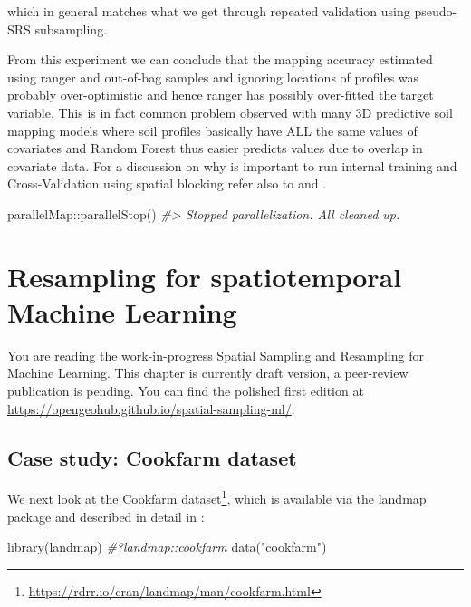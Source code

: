 \documentclass[
  graybox,natbib,nospthms]{svmono}
\newenvironment{Shaded}{\begin{snugshade}}{\end{snugshade}}
\newcommand{\CommentTok}[1]{\textcolor[rgb]{0.37,0.37,0.37}{\textit{#1}}}
\newcommand{\FunctionTok}[1]{\textcolor[rgb]{0,0,0}{#1}}
\newcommand{\NormalTok}[1]{#1}
\newcommand{\SpecialCharTok}[1]{\textcolor[rgb]{0,0,0}{#1}}
\newcommand{\StringTok}[1]{\textcolor[rgb]{0.5,0.5,0.5}{#1}}
\renewcommand{\href}[2]{#2 (\url{#1})}
\renewcommand{\href}[2]{#2\footnote{\url{#1}}}
\begin{document}
which in general matches what we get through repeated validation using pseudo-SRS
subsampling.

From this experiment we can conclude that the mapping accuracy estimated using
ranger and out-of-bag samples and ignoring locations of profiles was
probably over-optimistic and hence ranger has possibly over-fitted the target variable.
This is in fact common problem observed with many 3D predictive soil mapping models
where soil profiles basically have ALL the same values of covariates and Random
Forest thus easier predicts values due to overlap in covariate data. For a
discussion on why is important to run internal training and Cross-Validation
using spatial blocking refer also to \citet{gasch2015spatio} and \citet{meyer2018improving}.

\begin{Shaded}
\begin{Highlighting}[]
\NormalTok{parallelMap}\SpecialCharTok{::}\FunctionTok{parallelStop}\NormalTok{()}
\CommentTok{\#\textgreater{} Stopped parallelization. All cleaned up.}
\end{Highlighting}
\end{Shaded}

\hypertarget{resampling-for-spatiotemporal-machine-learning}{%
\chapter{Resampling for spatiotemporal Machine Learning}\label{resampling-for-spatiotemporal-machine-learning}}

You are reading the work-in-progress Spatial Sampling and Resampling for Machine Learning. This chapter is currently draft version, a peer-review publication is pending. You can find the polished first edition at \url{https://opengeohub.github.io/spatial-sampling-ml/}.

\hypertarget{case-study-cookfarm-dataset}{%
\section{Case study: Cookfarm dataset}\label{case-study-cookfarm-dataset}}

We next look at the \href{https://rdrr.io/cran/landmap/man/cookfarm.html}{Cookfarm dataset}, which is available via the landmap
package and described in detail in \citet{gasch2015spatio}:

\begin{Shaded}
\begin{Highlighting}[]
\FunctionTok{library}\NormalTok{(landmap)}
\CommentTok{\#?landmap::cookfarm}
\FunctionTok{data}\NormalTok{(}\StringTok{"cookfarm"}\NormalTok{)}
\end{Highlighting}
\end{Shaded}
\end{document}

